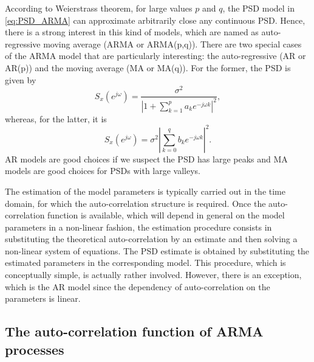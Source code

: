 According to Weierstrass theorem, for large values $p$ and $q$, the PSD model in \eqref{eq:PSD_ARMA} can approximate arbitrarily close any continuous PSD. Hence, there is a strong interest in this kind of models, which are named as auto-regressive moving average (ARMA or ARMA(p,q)). There are two special cases of the ARMA model that are particularly interesting: the auto-regressive (AR or AR(p)) and the moving average (MA or MA(q)). For the former, the PSD is given by
\begin{equation}
\label{eq:PSD_AR}
S_x(e^{j \omega}) = \frac{\sigma^2}{\displaystyle \left|1 + \sum_{k = 1}^{p} a_k e^{-j \omega k}\right|^2},
\end{equation}
whereas, for the latter, it is
\begin{equation}
\label{eq:PSD_ARMA}
S_x(e^{j \omega}) =  \sigma^2 \left|\sum_{k = 0}^{q} b_k e^{-j \omega k}\right|^2.
\end{equation}
AR models are good choices if we suspect the PSD has large peaks and MA models are good choices for PSDs with large valleys.

The estimation of the model parameters is typically carried out in the time domain, for which the auto-correlation structure is required. Once the auto-correlation function is available, which will depend in general on the model parameters in a non-linear fashion, the estimation procedure consists in substituting the theoretical auto-correlation by an estimate and then solving a non-linear system of equations. The PSD estimate is obtained by substituting the estimated parameters in the corresponding model. This procedure, which is conceptually simple, is actually rather involved. However, there is an exception, which is the AR model since the dependency of auto-correlation on the parameters is linear.

\subsection{The auto-correlation function of ARMA processes}

